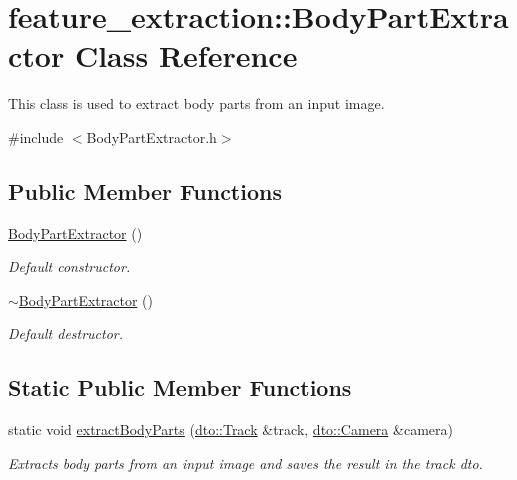 \hypertarget{classfeature__extraction_1_1_body_part_extractor}{}\section{feature\+\_\+extraction\+:\+:Body\+Part\+Extractor Class Reference}
\label{classfeature__extraction_1_1_body_part_extractor}


This class is used to extract body parts from an input image.  




{\ttfamily \#include $<$Body\+Part\+Extractor.\+h$>$}

\subsection*{Public Member Functions}
\begin{DoxyCompactItemize}
\item 
\mbox{\label{classfeature__extraction_1_1_body_part_extractor_a5d81bd21571b14fffd61f1769d2e3186}} 
\mbox{\hyperlink{classfeature__extraction_1_1_body_part_extractor_a5d81bd21571b14fffd61f1769d2e3186}{Body\+Part\+Extractor}} ()
\begin{DoxyCompactList}\small\item\em Default constructor. \end{DoxyCompactList}\item 
\mbox{\label{classfeature__extraction_1_1_body_part_extractor_aa5c03f514ee2db80a1d5c3430959a7f1}} 
\mbox{\hyperlink{classfeature__extraction_1_1_body_part_extractor_aa5c03f514ee2db80a1d5c3430959a7f1}{$\sim$\+Body\+Part\+Extractor}} ()
\begin{DoxyCompactList}\small\item\em Default destructor. \end{DoxyCompactList}\end{DoxyCompactItemize}
\subsection*{Static Public Member Functions}
\begin{DoxyCompactItemize}
\item 
\mbox{\label{classfeature__extraction_1_1_body_part_extractor_aab59053189ebd1d419db2b81b38fe25f}} 
static void \mbox{\hyperlink{classfeature__extraction_1_1_body_part_extractor_aab59053189ebd1d419db2b81b38fe25f}{extract\+Body\+Parts}} (\mbox{\hyperlink{structdto_1_1_track}{dto\+::\+Track}} \&track, \mbox{\hyperlink{structdto_1_1_camera}{dto\+::\+Camera}} \&camera)
\begin{DoxyCompactList}\small\item\em Extracts body parts from an input image and saves the result in the track dto. \end{DoxyCompactList}\end{DoxyCompactItemize}


